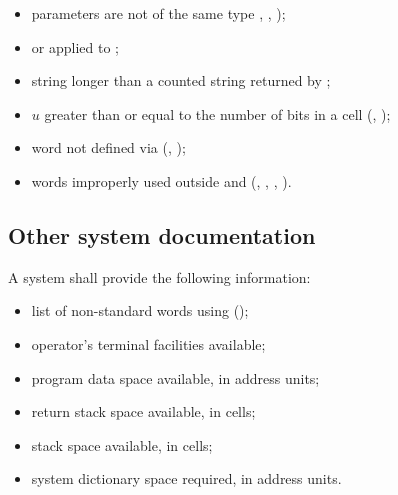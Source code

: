\begin{itemize}
\item parameters are not of the same type ,
	, );

\item {} or
	 applied to
	;

\item string longer than a counted string returned by
	;

\item $u$ greater than or equal to the number of bits in a cell
	(, );

\item word not defined via 
	(, );

\item words improperly used outside
	 and 
	(, ,
	 , ).

\end{itemize}


\subsection{Other system documentation} %

A system shall provide the following information:

\begin{itemize}

\item list of non-standard words using  
	();

\item operator's terminal facilities available;

\item program data space available, in address units;

\item return stack space available, in cells;

\item stack space available, in cells;

\item system dictionary space required, in address units.
\end{itemize}



